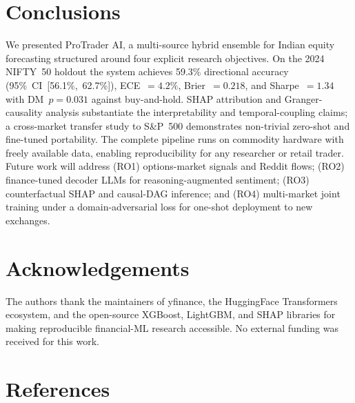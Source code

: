 \documentclass[12pt,a4paper]{article}
\begin{document}
\section{Conclusions}

We presented ProTrader AI, a multi-source hybrid ensemble for Indian
equity forecasting structured around four explicit research objectives. On the
2024 NIFTY~50 holdout the system achieves 59.3\% directional accuracy
(95\%~CI~[56.1\%,~62.7\%]), ECE~$=4.2\%$, Brier~$=0.218$, and Sharpe~$=1.34$
with DM~$p=0.031$ against buy-and-hold. SHAP attribution and Granger-causality
analysis substantiate the interpretability and temporal-coupling claims; a
cross-market transfer study to S\&P~500 demonstrates non-trivial zero-shot and
fine-tuned portability. The complete pipeline runs on commodity hardware with
freely available data, enabling reproducibility for any researcher or retail
trader. Future work will address (RO1) options-market signals and Reddit flows;
(RO2) finance-tuned decoder LLMs for reasoning-augmented sentiment; (RO3)
counterfactual SHAP and causal-DAG inference; and (RO4) multi-market joint
training under a domain-adversarial loss for one-shot deployment to new exchanges.

\section{Acknowledgements}

The authors thank the maintainers of yfinance, the HuggingFace Transformers
ecosystem, and the open-source XGBoost, LightGBM, and SHAP libraries for making
reproducible financial-ML research accessible. No external funding was received
for this work.

\section{References}
\end{document}
